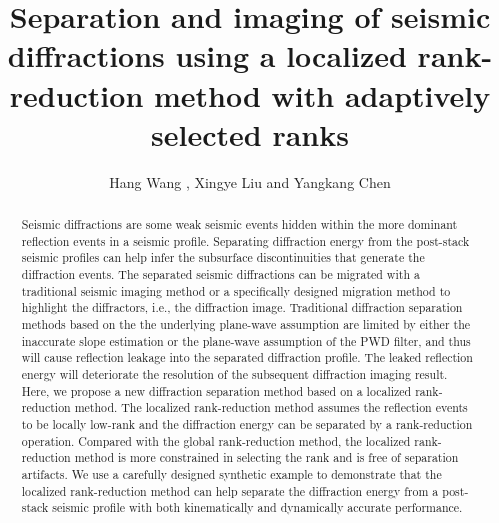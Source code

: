 
\title{Separation and imaging of seismic diffractions using a localized rank-reduction method with adaptively selected ranks}

\renewcommand{\thefootnote}{\fnsymbol{footnote}}

\author{Hang Wang \footnotemark[1], Xingye Liu \footnotemark[2] and Yangkang Chen\footnotemark[1]}


\address{
\footnotemark[1]
Key Laboratory of Geoscience Big Data and Deep Resource of Zhejiang Province\\
School of Earth Sciences\\
Zhejiang University\\
Hangzhou, Zhejiang Province, China, 310027\\
chenyk2016@gmail.com \& 18328504171@163.com\\
\footnotemark[2]
College of Geology and Environment\\
Xi’an University of Science and Technology\\
Xi’an, Shaanxi Province, China, 710054 \\
lwxwyh506673@126.com\\
Corresponding Author: Yangkang Chen (chenyk2016@gmail.com) 
}


\DeclareRobustCommand{\dlo}[1]{}
\DeclareRobustCommand{\wen}[1]{#1}

\begin{abstract}
Seismic diffractions are some weak seismic events hidden within the more dominant reflection events in a seismic profile. Separating diffraction energy from the post-stack seismic profiles can help infer the subsurface discontinuities that generate the diffraction events. The separated seismic diffractions can be migrated with a traditional seismic imaging method or a specifically designed migration method to highlight the diffractors, i.e., the diffraction image. Traditional diffraction separation methods based on the the underlying plane-wave assumption are limited by either the inaccurate slope estimation or the plane-wave assumption of the PWD filter, and thus will cause reflection leakage into the separated diffraction profile. The leaked reflection energy will deteriorate the resolution of the subsequent diffraction imaging result. Here, we propose a new diffraction separation method based on a localized rank-reduction method. The localized rank-reduction method assumes the reflection events to be locally low-rank and the diffraction energy can be separated by a rank-reduction operation. Compared with the global rank-reduction method, the localized rank-reduction method is more constrained in selecting the rank and is free of separation artifacts. We use a carefully designed synthetic example to demonstrate that the localized rank-reduction method can help separate the diffraction energy from a post-stack seismic profile with both kinematically and dynamically accurate performance. 
\end{abstract}

